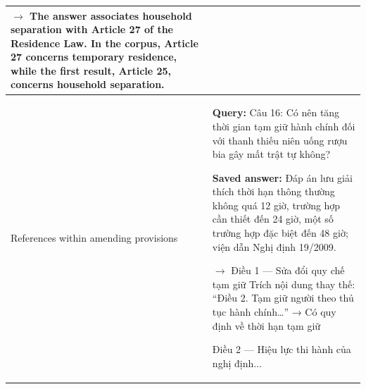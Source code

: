 \begin{longtable}{@{}>{\raggedright\arraybackslash}p{3cm}>{\raggedright\arraybackslash}p{12.25cm}@{}}
\(\rightarrow\) The answer associates household separation with Article 27 of the Residence Law. In the corpus, Article 27 concerns temporary residence, while the first result, Article 25, concerns household separation.\\
\midrule
References within amending provisions &
\textbf{Query:} Câu 16: Có nên tăng thời gian tạm giữ hành chính đối với thanh thiếu niên uống rượu bia gây mất trật tự không?\par\smallskip
\textbf{Saved answer:} Đáp án lưu giải thích thời hạn thông thường không quá 12 giờ, trường hợp cần thiết đến 24 giờ, một số trường hợp đặc biệt đến 48 giờ; viện dẫn Nghị định 19/2009.\par\smallskip
\(\rightarrow\) 
Điều 1 — Sửa đổi quy chế tạm giữ
    Trích nội dung thay thế:
    “Điều 2. Tạm giữ người theo thủ tục hành chính…”
        → Có quy định về thời hạn tạm giữ

Điều 2 — Hiệu lực thi hành của nghị định...


\end{longtable}

